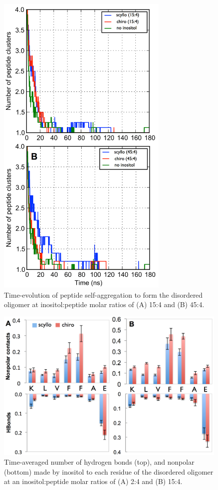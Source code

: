 \begin{figure}[ht]
\centering
\includegraphics[width=8.25cm]{figures/appendixA/inos2_figures_SI_disorderedCluster.pdf}
\caption{Time-evolution of peptide self-aggregation to form the disordered oligomer at inositol:peptide molar ratios of (A) 15:4 and (B) 45:4.}
\label{fig:SI-disorderedCluster}
\end{figure}

\begin{figure}[ht]
\centering
\includegraphics[width=14cm]{figures/appendixA/inos2_figures_SI_disorderedBinding_revised.pdf}
\caption{Time-averaged number of hydrogen bonds (top), and nonpolar (bottom) made by inositol to each residue of the disordered oligomer at an inositol:peptide molar ratios of (A) 2:4 and (B) 15:4.}
\label{fig:SI-disorderedBinding}
\end{figure}

